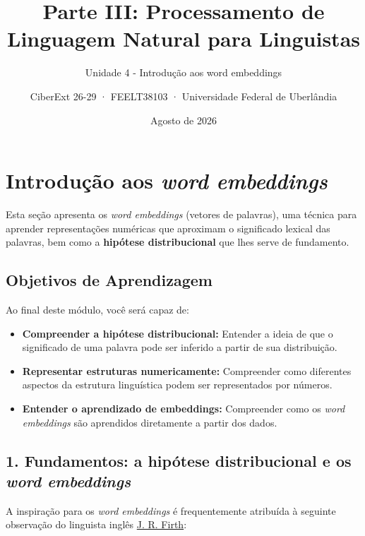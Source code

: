 \documentclass[
  brazilian,
]{article}
\title{Parte III: Processamento de Linguagem Natural para Linguistas}
\subtitle{Unidade 4 - Introdução aos word embeddings}
\author{CiberExt 26-29 · FEELT38103 · Universidade Federal de
Uberlândia}
\date{Agosto de 2026}
\providecommand{\tightlist}{%
  \setlength{\itemsep}{0pt}\setlength{\parskip}{0pt}}
\begin{document}
\maketitle

\hypertarget{introduuxe7uxe3o-aos-word-embeddings}{%
\section{\texorpdfstring{Introdução aos \emph{word
embeddings}}{Introdução aos word embeddings}}\label{introduuxe7uxe3o-aos-word-embeddings}}

Esta seção apresenta os \emph{word embeddings} (vetores de palavras),
uma técnica para aprender representações numéricas que aproximam o
significado lexical das palavras, bem como a \textbf{hipótese
distribucional} que lhes serve de fundamento.

\hypertarget{objetivos-de-aprendizagem}{%
\subsection{Objetivos de Aprendizagem}\label{objetivos-de-aprendizagem}}

Ao final deste módulo, você será capaz de:

\begin{itemize}
\tightlist
\item
  \textbf{Compreender a hipótese distribucional:} Entender a ideia de
  que o significado de uma palavra pode ser inferido a partir de sua
  distribuição.
\item
  \textbf{Representar estruturas numericamente:} Compreender como
  diferentes aspectos da estrutura linguística podem ser representados
  por números.
\item
  \textbf{Entender o aprendizado de embeddings:} Compreender como os
  \emph{word embeddings} são aprendidos diretamente a partir dos dados.
\end{itemize}

\hypertarget{fundamentos-a-hipuxf3tese-distribucional-e-os-word-embeddings}{%
\subsection{\texorpdfstring{1. Fundamentos: a hipótese distribucional e
os \emph{word
embeddings}}{1. Fundamentos: a hipótese distribucional e os word embeddings}}\label{fundamentos-a-hipuxf3tese-distribucional-e-os-word-embeddings}}

A inspiração para os \emph{word embeddings} é frequentemente atribuída à
seguinte observação do linguista inglês
\href{https://en.wikipedia.org/wiki/John_Rupert_Firth}{J. R. Firth}:
\end{document}
